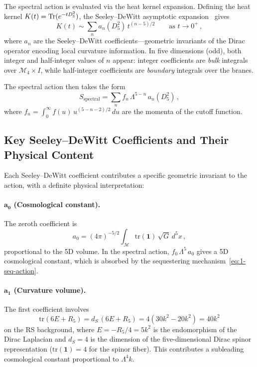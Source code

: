 The spectral action is evaluated via the heat kernel expansion. Defining the heat kernel $K(t) = \operatorname{Tr}(e^{-t D_5^2})$, the Seeley--DeWitt asymptotic expansion~\cite{ch1:gilkey75,ch1:branson-gilkey} gives
\begin{equation}
\label{eq:1-heat-kernel}
K(t) \sim \sum_n a_n(D_5^2)\, t^{(n-5)/2} \qquad \text{as } t \to 0^+\,,
\end{equation}
where $a_n$ are the Seeley--DeWitt coefficients---geometric invariants of the Dirac operator encoding local curvature information. In five dimensions (odd), both integer and half-integer values of $n$ appear: integer coefficients are \emph{bulk} integrals over $\mathcal{M}_4 \times I$, while half-integer coefficients are \emph{boundary} integrals over the branes.

The spectral action then takes the form
\begin{equation}
\label{eq:1-spectral-expansion}
S_{\mathrm{spectral}} = \sum_n f_n\, \Lambda^{5-n}\, a_n(D_5^2)\,,
\end{equation}
where $f_n = \int_0^\infty f(u)\, u^{(5-n-2)/2}\, du$ are the momenta of the cutoff function.

\subsection{Key Seeley--DeWitt Coefficients and Their Physical Content}
\label{sec:1-seeley-dewitt}

Each Seeley--DeWitt coefficient contributes a specific geometric invariant to the action, with a definite physical interpretation:

\paragraph{$\bm{a_0}$ (Cosmological constant).} The zeroth coefficient is
\begin{equation}
\label{eq:1-a0}
a_0 = (4\pi)^{-5/2} \int_{\mathcal{M}} \mathrm{tr}(\mathbf{1})\, \sqrt{G}\, d^5x\,,
\end{equation}
proportional to the 5D volume. In the spectral action, $f_0\, \Lambda^5\, a_0$ gives a 5D cosmological constant, which is absorbed by the sequestering mechanism~\eqref{eq:1-seq-action}.

\paragraph{$\bm{a_1}$ (Curvature volume).} The first coefficient involves
\begin{equation}
\label{eq:1-a1}
\mathrm{tr}(6E + R_5) = d_S\,(6E + R_5) = 4(30k^2 - 20k^2) = 40k^2
\end{equation}
on the RS background, where $E = -R_5/4 = 5k^2$ is the endomorphism of the Dirac Laplacian and $d_S = 4$ is the dimension of the five-dimensional Dirac spinor representation ($\mathrm{tr}(\mathbf{1}) = 4$ for the spinor fiber). This contributes a subleading cosmological constant proportional to $\Lambda^4 k$.

